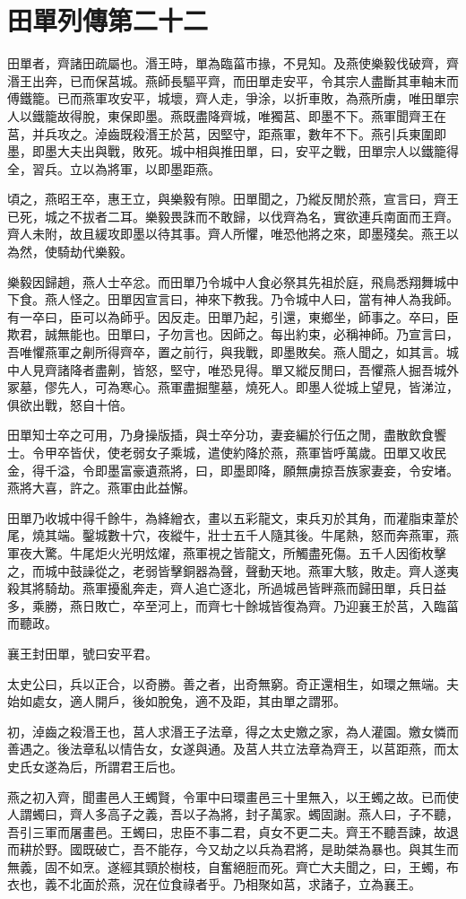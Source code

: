 \chapter{田單列傳第二十二}

田單者，齊諸田疏屬也。湣王時，單為臨菑市掾，不見知。及燕使樂毅伐破齊，齊湣王出奔，已而保莒城。燕師長驅平齊，而田單走安平，令其宗人盡斷其車軸末而傅鐵籠。已而燕軍攻安平，城壞，齊人走，爭涂，以折車敗，為燕所虜，唯田單宗人以鐵籠故得脫，東保即墨。燕既盡降齊城，唯獨莒、即墨不下。燕軍聞齊王在莒，并兵攻之。淖齒既殺湣王於莒，因堅守，距燕軍，數年不下。燕引兵東圍即墨，即墨大夫出與戰，敗死。城中相與推田單，曰，安平之戰，田單宗人以鐵籠得全，習兵。立以為將軍，以即墨距燕。

頃之，燕昭王卒，惠王立，與樂毅有隙。田單聞之，乃縱反閒於燕，宣言曰，齊王已死，城之不拔者二耳。樂毅畏誅而不敢歸，以伐齊為名，實欲連兵南面而王齊。齊人未附，故且緩攻即墨以待其事。齊人所懼，唯恐他將之來，即墨殘矣。燕王以為然，使騎劫代樂毅。

樂毅因歸趙，燕人士卒忿。而田單乃令城中人食必祭其先祖於庭，飛鳥悉翔舞城中下食。燕人怪之。田單因宣言曰，神來下教我。乃令城中人曰，當有神人為我師。有一卒曰，臣可以為師乎。因反走。田單乃起，引還，東鄉坐，師事之。卒曰，臣欺君，誠無能也。田單曰，子勿言也。因師之。每出約束，必稱神師。乃宣言曰，吾唯懼燕軍之劓所得齊卒，置之前行，與我戰，即墨敗矣。燕人聞之，如其言。城中人見齊諸降者盡劓，皆怒，堅守，唯恐見得。單又縱反閒曰，吾懼燕人掘吾城外冢墓，僇先人，可為寒心。燕軍盡掘壟墓，燒死人。即墨人從城上望見，皆涕泣，俱欲出戰，怒自十倍。

田單知士卒之可用，乃身操版插，與士卒分功，妻妾編於行伍之閒，盡散飲食饗士。令甲卒皆伏，使老弱女子乘城，遣使約降於燕，燕軍皆呼萬歲。田單又收民金，得千溢，令即墨富豪遺燕將，曰，即墨即降，願無虜掠吾族家妻妾，令安堵。燕將大喜，許之。燕軍由此益懈。

田單乃收城中得千餘牛，為絳繒衣，畫以五彩龍文，束兵刃於其角，而灌脂束葦於尾，燒其端。鑿城數十穴，夜縱牛，壯士五千人隨其後。牛尾熱，怒而奔燕軍，燕軍夜大驚。牛尾炬火光明炫燿，燕軍視之皆龍文，所觸盡死傷。五千人因銜枚擊之，而城中鼓譟從之，老弱皆擊銅器為聲，聲動天地。燕軍大駭，敗走。齊人遂夷殺其將騎劫。燕軍擾亂奔走，齊人追亡逐北，所過城邑皆畔燕而歸田單，兵日益多，乘勝，燕日敗亡，卒至河上，而齊七十餘城皆復為齊。乃迎襄王於莒，入臨菑而聽政。

襄王封田單，號曰安平君。

太史公曰，兵以正合，以奇勝。善之者，出奇無窮。奇正還相生，如環之無端。夫始如處女，適人開戶，後如脫兔，適不及距，其由單之謂邪。

初，淖齒之殺湣王也，莒人求湣王子法章，得之太史嬓之家，為人灌園。嬓女憐而善遇之。後法章私以情告女，女遂與通。及莒人共立法章為齊王，以莒距燕，而太史氏女遂為后，所謂君王后也。

燕之初入齊，聞畫邑人王蠋賢，令軍中曰環畫邑三十里無入，以王蠋之故。已而使人謂蠋曰，齊人多高子之義，吾以子為將，封子萬家。蠋固謝。燕人曰，子不聽，吾引三軍而屠畫邑。王蠋曰，忠臣不事二君，貞女不更二夫。齊王不聽吾諫，故退而耕於野。國既破亡，吾不能存，今又劫之以兵為君將，是助桀為暴也。與其生而無義，固不如烹。遂經其頸於樹枝，自奮絕脰而死。齊亡大夫聞之，曰，王蠋，布衣也，義不北面於燕，況在位食祿者乎。乃相聚如莒，求諸子，立為襄王。